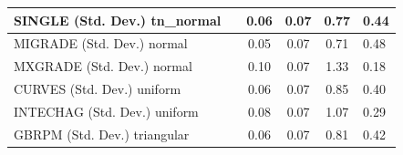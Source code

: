 \begin{table}
\begin{center}
\begin{tabular}{|l|l|c|c|c|l|}
			\hline
			SINGLE (Std. Dev.) tn_normal &  & 0.06 & 0.07 & 0.77 & 0.44 \\
			\hline
			MIGRADE (Std. Dev.) normal &  & 0.05 & 0.07 & 0.71 & 0.48 \\
			\hline
			MXGRADE (Std. Dev.) normal &  & 0.10 & 0.07 & 1.33 & 0.18 \\
			\hline
			CURVES (Std. Dev.) uniform &  & 0.06 & 0.07 & 0.85 & 0.40 \\
			\hline
			INTECHAG (Std. Dev.) uniform &  & 0.08 & 0.07 & 1.07 & 0.29 \\
			\hline
			GBRPM (Std. Dev.) triangular &  & 0.06 & 0.07 & 0.81 & 0.42 \\
			\hline
		\end{tabular}
	\end{center}
\end{table}